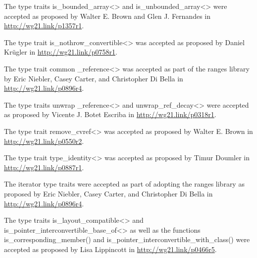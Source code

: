 The type traits is\_bounded\_array<> and is\_unbounded\_array<> were accepted as proposed by Walter E. Brown and Glen J. Fernandes in \url{http://wg21.link/p1357r1}.

The type trait is\_nothrow\_convertible<> was accepted as proposed by Daniel Kr{\"u}gler in \url{http://wg21.link/p0758r1}.

The type trait common \_reference<> was accepted as part of the ranges library by Eric Niebler, Casey Carter, and Christopher Di Bella in \url{http://wg21.link/p0896r4}.

The type traits unwrap \_reference<> and unwrap\_ref\_decay<> were accepted as proposed by Vicente J. Botet Escriba in \url{http://wg21.link/p0318r1}.

The type trait remove\_cvref<> was accepted as proposed by Walter E. Brown in \url{http://wg21.link/p0550r2}.

The type trait type\_identity<> was accepted as proposed by Timur Doumler in \url{http://wg21.link/p0887r1}.

The iterator type traits were accepted as part of adopting the ranges library as proposed by Eric Niebler, Casey Carter, and Christopher Di Bella in \url{http://wg21.link/p0896r4}.

The type traits is\_layout\_compatible<> and is\_pointer\_interconvertible\_base\_of<> as well as the functions is\_corresponding\_member() and is\_pointer\_interconvertible\_with\_class() were accepted as proposed by Lisa Lippincott in \url{http://wg21.link/p0466r5}.